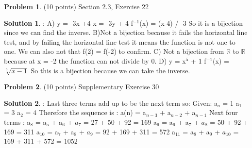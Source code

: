 \documentclass{article}
\theoremstyle{definition}
\newtheorem{problem}{Problem}
\newtheorem*{solution}{Solution}
\begin{document}
\newpage

\begin{problem} (10 points) 
Section 2.3, Exercise 22
\end{problem}
\begin{solution}:
\newline
A) y = -3x +4
\newline
x = -3y + 4
\newline
f$^{-1}$(x) = (x-4) / -3\newline
So it is a bijection since we can find the inverse. \bigskip
\newline
B)Not a bijection because it fails the horizontal line test, and by failing the horizontal line test it means the function is not one to one. We can also not that f(2) = f(-2) to confirm.
\bigskip
\newline
C) Not a bijection from $\mathbb{R}$ to $\mathbb{R}$ because at x = -2 the function can not divide by 0.
\bigskip
\newline
D) y = x$^5$ + 1
\newline
f$^{-1}$(x) = $\sqrt[5]{x-1}$
\newline
So this is a bijection because we can take the inverse.
\end{solution}

\newpage

\begin{problem} (10 points) 
Supplementary Exercise 30
\end{problem}
\begin{solution}:
\newline
Last three terms add up to be the next term so:
\newline
Given:
\newline
a$_o$ = 1
\newline
a$_1$ = 3
\newline
a$_2$ = 4
\newline
Therefore the sequence is : a(n) = a$_{n-3}$ + a$_{n-2}$ + a$_{n-1}$ 
\newline
Next four terms : 
\newline
a$_8$ = a$_5$ + a$_6$ + $a_7$ = 27 + 50 + 92 = 169
\newline
a$_9$ = a$_6$ + a$_7$ + $a_8$ = 50 + 92 + 169 = 311
\newline
a$_{10}$ = a$_7$ + a$_8$ + $a_9$ = 92 + 169 + 311 = 572
\newline
a$_{11}$ = a$_8$ + a$_9$ + $a_{10}$ = 169 + 311 + 572 = 1052
\newline

\end{solution}
\end{document}
